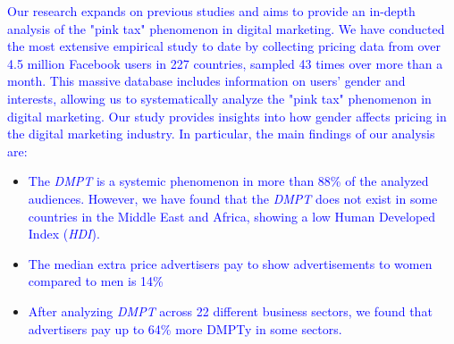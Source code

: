 \documentclass[twocolumn]{bmcart}\usepackage{lineno}
\begin{document}
\textcolor{blue}{Our research expands on previous studies and aims to provide an in-depth analysis of the "pink tax" phenomenon in digital marketing. We have conducted the most extensive empirical study to date by collecting pricing data from over 4.5 million Facebook users in 227 countries, sampled 43 times over more than a month. This massive database includes information on users' gender and interests, allowing us to systematically analyze the "pink tax" phenomenon in digital marketing. Our study provides insights into how gender affects pricing in the digital marketing industry. In particular, the main findings of our analysis are:}

\begin{itemize}

\item \textcolor{blue}{The \emph{DMPT} is a systemic phenomenon in more than 88\% of the analyzed audiences. However, we have found that the \emph{DMPT} does not exist in some countries in the Middle East and Africa, showing a low Human Developed Index (\emph{HDI}).} 

\item \textcolor{blue}{The median extra price advertisers pay to show advertisements to women compared to men is 14\%}

\item \textcolor{blue}{After analyzing \emph{DMPT} across 22 different business sectors, we found that advertisers pay up to 64\% more DMPTy in some sectors.}
\end{itemize}


\end{document}
